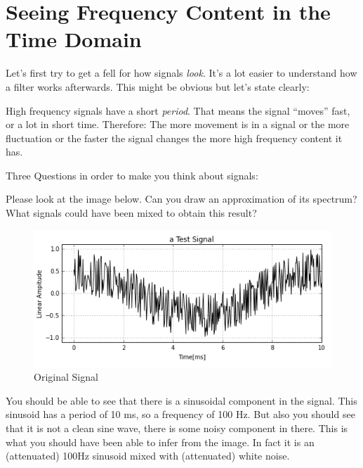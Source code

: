 \section{Seeing Frequency Content in the Time Domain}

Let's first try to get a fell for how signals \textit{look}. It's a lot easier to understand how a filter works afterwards. This might be obvious but let's state clearly:

\begin{framed}
	High frequency signals have a short \textit{period}. That means the signal ``moves'' fast, or a lot in short time. Therefore: The more movement is in a signal or the more fluctuation or the faster the signal changes the more high frequency content it has.
\end{framed}


Three Questions in order to make you think about signals:


\begin{question}
	Please look at the image below. Can you draw an approximation of its spectrum? What signals could have been mixed to obtain this result?
\begin{figure}[H]
	\begin{center}
		\includegraphics[width = 14cm]{raetsel_original.png}
		\caption{Original Signal}
		\label{fig:originalSignal}
	\end{center}
\end{figure}
\end{question}


\begin{Answer}
You should be able to see that there is a sinusoidal component in the signal. This sinusoid has a period of 10 ms, so a frequency of 100 Hz. But also you should see that it is not a clean sine wave, there is some noisy component in there. This is what you should have been able to infer from the image. In fact it is an (attenuated) 100Hz sinusoid mixed with (attenuated) white noise.
\end{Answer}


